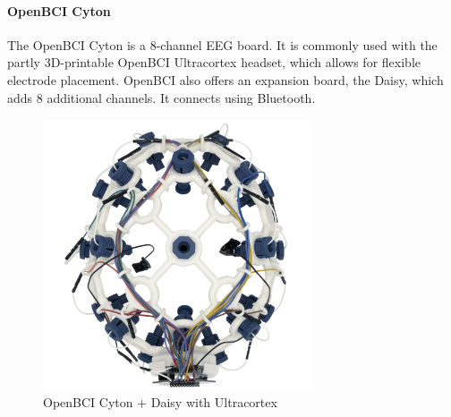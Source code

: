     \begin{minipage}{\textwidth}
        \paragraph*{OpenBCI Cyton}
        The OpenBCI Cyton is a 8-channel EEG board. It is commonly used with the partly 3D-printable OpenBCI Ultracortex headset, which allows for flexible electrode placement. OpenBCI also offers an expansion board, the Daisy, which adds 8 additional channels. It connects using Bluetooth.


        \begin{figure}[H]
            \centering
            \includegraphics[width=80mm]{img/openbci-cyton.jpg}
            \caption{OpenBCI Cyton + Daisy with Ultracortex}\label{fig:cyton}
        \end{figure}
    \end{minipage}

    \vspace{1cm}

